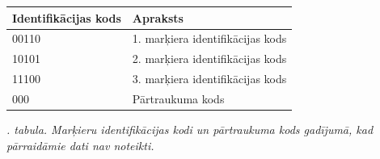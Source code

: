 \documentclass[12pt, a4paper, oneside, openright]{article}
\renewcommand{\thectables}{\arabic{ctables}}
\begin{document}
\newpage

\begin{samepage}
\begin{table}[h]
\centering
\begin{tabular}{|l|l|}
\hline
\rowcolor[HTML]{D0D0D0} 
Identifikācijas kods & Apraksts                         \\ \hline
00110                & 1. marķiera identifikācijas kods \\ \hline
10101                & 2. marķiera identifikācijas kods \\ \hline
11100                & 3. marķiera identifikācijas kods \\ \hline
000                  & Pārtraukuma kods                 \\ \hline
\end{tabular}
\end{table}
\vspace{-0.5cm}
\label{ctables:idc_1}
\begin{center}
\footnotesize{
\textit{\thectables. tabula. Marķieru identifikācijas kodi un pārtraukuma kods gadījumā, kad pārraidāmie dati nav noteikti.}}
\end{center}
\end{samepage}
\end{document}

